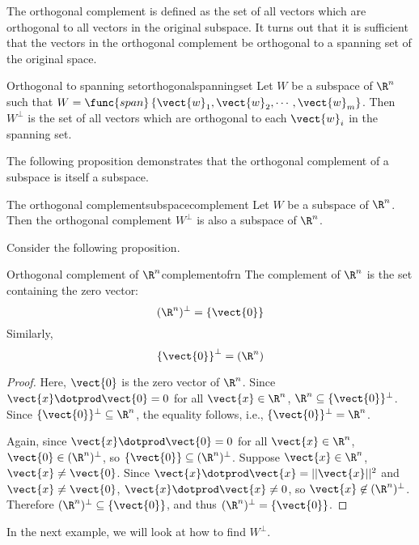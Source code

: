 The orthogonal complement is defined as the set of all vectors which are orthogonal to all vectors in the original subspace. It turns out that it is sufficient that the vectors in the orthogonal complement be orthogonal to a spanning set of the original space.

\begin{proposition}{Orthogonal to spanning set}{orthogonalspanningset}
Let $W$ be a subspace of $\R^n$ such that $W = \func{span} \left\{ \vect{w}_1, \vect{w}_2, \cdots, \vect{w}_m \right\}$. Then $W^{\perp}$ is the set of all vectors which are orthogonal to each $\vect{w}_i$ in the spanning set. 
\end{proposition}

The following proposition demonstrates that the orthogonal complement of a subspace is itself a subspace. 

\begin{proposition}{The orthogonal complement}{subspacecomplement}
Let $W$ be a subspace of $\R^n$. Then the orthogonal complement $W^{\perp}$ is also a subspace of $\R^n$.
\end{proposition}

Consider the following proposition.

\begin{proposition}{Orthogonal complement of $\R^n$}{complementofrn}
The complement of $\R^n$ is the set containing the zero vector:
\[
 (\R^n)^{\perp} = \left\{ \vect{0} \right\}
\]
Similarly, 
\[
\left\{ \vect{0} \right\}^{\perp} = (\R^n)
\]
\end{proposition}

\begin{proof}
Here, $\vect{0}$ is the zero vector of $\R^n$.
Since $\vect{x}\dotprod\vect{0}=0$ for all $\vect{x}\in\R^n$, 
$\R^n\subseteq\{ \vect{0}\}^{\perp}$.
Since $\{ \vect{0}\}^{\perp}\subseteq\R^n$, the equality follows,
i.e., $\{ \vect{0}\}^{\perp}=\R^n$.

Again, since $\vect{x}\dotprod\vect{0}=0$ for all $\vect{x}\in\R^n$,
$\vect{0}\in (\R^n)^{\perp}$, so $\{ \vect{0}\}\subseteq(\R^n)^{\perp}$.
Suppose $\vect{x}\in\R^n$, $\vect{x}\neq\vect{0}$.  
Since $\vect{x}\dotprod\vect{x}=||\vect{x}||^2$ and $\vect{x}\neq\vect{0}$,
$\vect{x}\dotprod\vect{x}\neq 0$, so $\vect{x}\not\in(\R^n)^{\perp}$.
Therefore $(\R^n)^{\perp}\subseteq \{\vect{0}\}$, and thus
$(\R^n)^{\perp}=\{\vect{0}\}$.
\end{proof}

In the next example, we will look at how to find
$W^{\perp}$.

